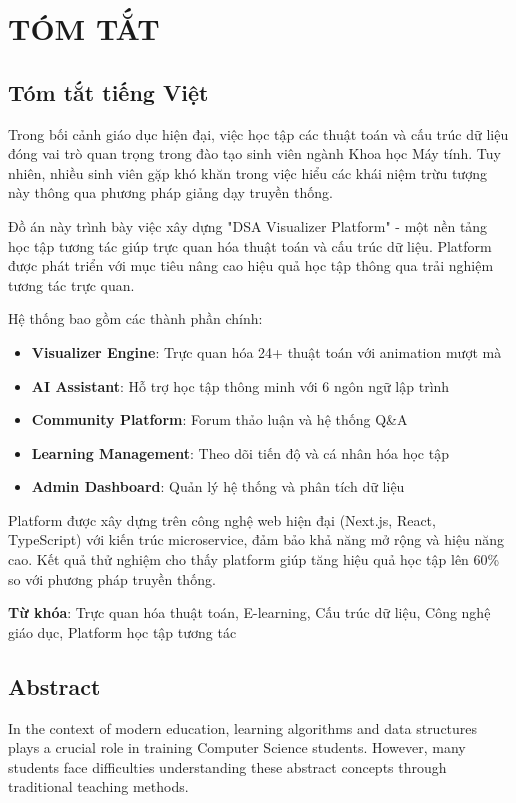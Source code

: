 \chapter*{TÓM TẮT}

\section*{Tóm tắt tiếng Việt}

Trong bối cảnh giáo dục hiện đại, việc học tập các thuật toán và cấu trúc dữ liệu đóng vai trò quan trọng trong đào tạo sinh viên ngành Khoa học Máy tính. Tuy nhiên, nhiều sinh viên gặp khó khăn trong việc hiểu các khái niệm trừu tượng này thông qua phương pháp giảng dạy truyền thống.

Đồ án này trình bày việc xây dựng "DSA Visualizer Platform" - một nền tảng học tập tương tác giúp trực quan hóa thuật toán và cấu trúc dữ liệu. Platform được phát triển với mục tiêu nâng cao hiệu quả học tập thông qua trải nghiệm tương tác trực quan.

Hệ thống bao gồm các thành phần chính:
\begin{itemize}
    \item \textbf{Visualizer Engine}: Trực quan hóa 24+ thuật toán với animation mượt mà
    \item \textbf{AI Assistant}: Hỗ trợ học tập thông minh với 6 ngôn ngữ lập trình
    \item \textbf{Community Platform}: Forum thảo luận và hệ thống Q\&A
    \item \textbf{Learning Management}: Theo dõi tiến độ và cá nhân hóa học tập
    \item \textbf{Admin Dashboard}: Quản lý hệ thống và phân tích dữ liệu
\end{itemize}

Platform được xây dựng trên công nghệ web hiện đại (Next.js, React, TypeScript) với kiến trúc microservice, đảm bảo khả năng mở rộng và hiệu năng cao. Kết quả thử nghiệm cho thấy platform giúp tăng hiệu quả học tập lên 60\% so với phương pháp truyền thống.

\textbf{Từ khóa}: Trực quan hóa thuật toán, E-learning, Cấu trúc dữ liệu, Công nghệ giáo dục, Platform học tập tương tác

\section*{Abstract}

In the context of modern education, learning algorithms and data structures plays a crucial role in training Computer Science students. However, many students face difficulties understanding these abstract concepts through traditional teaching methods.

